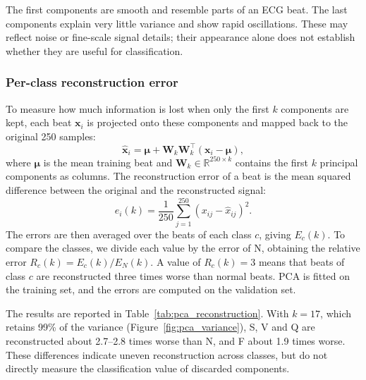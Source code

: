 \documentclass[11pt,oneside,a4paper]{article}
\begin{document}
    The first components are smooth and resemble parts of an ECG
    beat. The last components explain very little variance and
    show rapid oscillations. These may reflect noise or fine-scale
    signal details; their appearance alone does not establish
    whether they are useful for classification.

    \subsubsection{Per-class reconstruction error}
    \label{sec:pca_reconstruction}

    To measure how much information is lost when only the first
    $k$ components are kept, each beat $\mathbf{x}_i$ is projected
    onto these components and mapped back to the original 250
    samples:
    \begin{equation}
        \hat{\mathbf{x}}_i = \boldsymbol{\mu}
        + \mathbf{W}_k \mathbf{W}_k^{\top}
        (\mathbf{x}_i - \boldsymbol{\mu}),
    \end{equation}
    where $\boldsymbol{\mu}$ is the mean training beat and
    $\mathbf{W}_k \in \mathbb{R}^{250 \times k}$ contains the first
    $k$ principal components as columns. The reconstruction error
    of a beat is the mean squared difference between the original
    and the reconstructed signal:
    \begin{equation}
        e_i(k) = \frac{1}{250} \sum_{j=1}^{250}
        \left( x_{ij} - \hat{x}_{ij} \right)^2 .
    \end{equation}
    The errors are then averaged over the beats of each class $c$,
    giving $E_c(k)$. To compare the classes, we divide each value
    by the error of N, obtaining the relative error
    $R_c(k) = E_c(k) / E_N(k)$. A value of $R_c(k) = 3$ means that
    beats of class $c$ are reconstructed three times worse than
    normal beats. PCA is fitted on the training set, and the
    errors are computed on the validation set.

    The results are reported in Table~\ref{tab:pca_reconstruction}.
    With $k = 17$, which retains 99\% of the variance
    (Figure~\ref{fig:pca_variance}), S, V and Q are reconstructed
    about 2.7--2.8 times worse than N, and F about 1.9 times worse. 
    These differences indicate uneven reconstruction across classes,
    but do not directly measure the classification value of discarded
    components.
\end{document}
